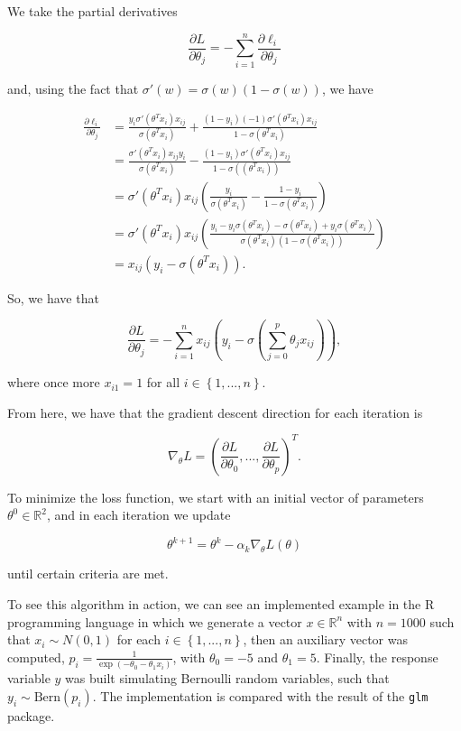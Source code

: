 We take the partial derivatives

$$
  \frac{\partial L}{\partial \theta_j} = - \sum_{i = 1}^n { \frac{\partial \ell_i}{\partial \theta_j} }
$$

and, using the fact that $\sigma'(w) = \sigma(w)(1-\sigma(w))$, we have

\begin{equation}
  \begin{split}
    \frac{\partial \ell_i}{\partial \theta_j} & =
    \frac{y_i \sigma'(\theta^T x_i) x_{ij} }  {\sigma(\theta^T x_i)} + \frac{(1 - y_i) (-1) \sigma'(\theta^T x_i) x_{ij}} {1 - \sigma(\theta^T x_i)} \\
    & = \frac{\sigma'(\theta^T x_i) x_{ij} y_i}{\sigma(\theta^T x_i)} - \frac{(1 - y_i) \sigma'(\theta^T x_i) x_{ij}}{1 - \sigma((\theta^T x_i))} \\
    & = \sigma'(\theta^T x_i) x_{ij} \left(\frac{y_i}{\sigma(\theta^T x_i)} - \frac{1-y_i}{1-\sigma(\theta^T x_i)} \right) \\
    & = \sigma'(\theta^T x_i) x_{ij} \left(\frac{y_i - y_i \sigma(\theta^T x_i) -
    \sigma(\theta^T x_i) + y_i \sigma(\theta^T x_i)}{\sigma(\theta^T x_i)(1-\sigma(\theta^T x_i))} \right) \\
    & = x_{ij}(y_i - \sigma(\theta^T x_i)).
  \end{split}
\end{equation}

So, we have that

$$
  \frac{\partial L}{\partial \theta_j} = - \sum_{i = 1}^n { x_{ij}(y_i - \sigma(\sum_{j=0}^{p}{\theta_j x_{ij}})) },
$$

where once more $x_{i1} = 1$ for all $i \in \left\{1, ..., n \right\}$.


From here, we have that the gradient descent direction for each iteration is

$$
  \nabla_{\theta} L = \left( \frac{\partial L}{\partial \theta_0}, ..., \frac{\partial L}{\partial \theta_p} \right)^T.
$$

To minimize the loss function, we start with an initial vector of parameters $\theta^0 \in \mathbb{R}^2$, and in each iteration we update

$$
  \theta^{k+1} = \theta^k - \alpha_k \nabla_{\theta} L(\theta)
$$

until certain criteria are met.

To see this algorithm in action, we can see an implemented example in the R programming language in which we generate a vector $x \in \mathbb{R}^n$ with $n = 1000$ such that $x_i \sim N(0, 1)$ for each $i \in \left\{1, ..., n \right\}$, then an auxiliary vector was computed, $p_i = \frac{1}{\exp \left( - \theta_0 - \theta_1 x_i \right)}$, with $\theta_0 = -5$ and $\theta_1 = 5$. Finally, the response variable $y$ was built simulating Bernoulli random variables, such that $y_i \sim \mathrm{Bern}(p_i)$.
The implementation is compared with the result of the \texttt{glm} package.

